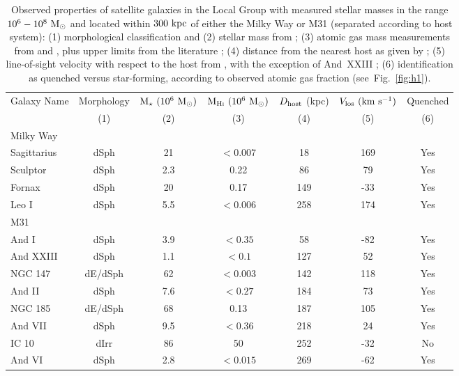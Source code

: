 \documentclass[usenatbib]{mn2e}
\newcommand{\mstar}{{\rm M}_{\star}}
\newcommand{\msun}{{\rm M}_{\odot}}
\newcommand{\kpc}{{\rm kpc}}
\begin{document}
\begin{table}
\centering 
\begin{tabular}{l c c c c c c } 
  \hline\hline 
  Galaxy Name & Morphology & $\mstar~(10^{6}~\msun)$ &
  ${\rm M}_{\rm H{\textsc{\tiny I}}}~(10^{6}~\msun)$ & $D_{\rm host}$ (kpc) &
  $V_{\rm los}~({\rm km}~{\rm s}^{-1})$ & Quenched \\
  & (1) & (2) & (3) & (4) & (5) & (6) \\
  \hline\hline
  Milky Way &  & & & & & \\
  \hline
Sagittarius & dSph & 21 & $< 0.007$ & 18 & 169 & Yes \\
Sculptor & dSph & 2.3 & 0.22 & 86 & 79 & Yes \\
Fornax & dSph & 20 & 0.17 & 149 & -33 & Yes \\
Leo I & dSph & 5.5 & $< 0.006$ & 258 & 174 & Yes \\
\hline
M31 &   & & & & & \\
\hline
And I & dSph & 3.9 & $< 0.35$ & 58 & -82 & Yes \\
And XXIII & dSph & 1.1 & $<0.1$ & 127 & 52 & Yes \\
NGC 147 & dE/dSph & 62 & $< 0.003$ & 142 & 118 & Yes \\
And II & dSph & 7.6 & $< 0.27$ & 184 & 73 & Yes \\
NGC 185 & dE/dSph & 68 & 0.13 & 187 & 105 & Yes \\
And VII & dSph & 9.5 & $< 0.36$ & 218 & 24 & Yes \\
IC 10 & dIrr & 86 & 50 & 252 & -32 & No \\
And VI & dSph & 2.8 & $< 0.015$ & 269 & -62 & Yes \\
\hline 
\hline
\end{tabular} 
\label{table:dwarfs} 
\caption{Observed properties of satellite galaxies in the Local Group
  with measured stellar masses in the range $10^{6}-10^{8}~\msun$ and
  located within $300~\kpc$ of either the Milky Way or M31 (separated
  according to host system):  
  (1) morphological classification and (2)
  stellar mass from \citet{mcconnachie12}; (3)
  atomic gas mass measurements from \citet{mcconnachie12} and
  \citet{grcevich09}, plus upper limits from the literature
  \citep{burton99, grcevich09, huang12a, giovanelli13};
  (4) distance from the nearest host as given by \citet{mcconnachie12};   
  (5) line-of-sight velocity with respect to the host from
  \citet{mcconnachie12}, with the exception of And~XXIII 
  \citep{kirby14}; (6) identification as quenched 
  versus star-forming, according to observed atomic gas fraction
  (see~Fig.~\ref{fig:h1}). } 
\end{table} 
\end{document}
